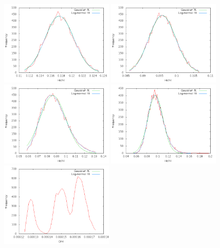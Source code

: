 \documentclass[useAMS,usenatbib]{mn2e}
\begin{document}
\begin{figure}
\includegraphics[width=0.48\textwidth]{figures/plot_binned_ngc6543_He_abund_ORL.png}
\includegraphics[width=0.48\textwidth]{figures/plot_binned_orion_esteban2004_He_abund_ORL.png}
\includegraphics[width=0.48\textwidth]{figures/plot_binned_B11_neat_He_abund_ORL.png}
\includegraphics[width=0.48\textwidth]{figures/plot_binned_NGC2022_He_abund_ORL.png}
\includegraphics[width=0.48\textwidth]{figures/plot_binned_Sp4-1_O_abund_CEL.png}

\end{figure}
\end{document}
